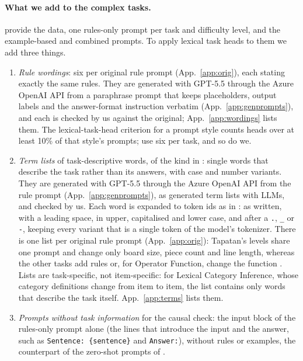 \documentclass[11pt,a4paper]{article}
\begin{document}
\paragraph{What we add to the complex tasks.}\label{sec:adapt} \citet{fu2026rules} provide the data, one rules-only prompt per task and difficulty level, and the example-based and combined prompts. To apply lexical task heads to them we add three things.
\begin{enumerate}
\item \emph{Rule wordings}: six per original rule prompt (App.~\ref{app:orig}), each stating exactly the same rules. They are generated with GPT-5.5 through the Azure OpenAI API from a paraphrase prompt that keeps placeholders, output labels and the answer-format instruction verbatim (App.~\ref{app:genprompts}), and each is checked by us against the original; App.~\ref{app:wordings} lists them. The lexical-task-head criterion for a prompt style counts heads over at least 10\% of that style's prompts; \citet{yang2026shared} use six per task, and so do we.
\item \emph{Term lists} of task-descriptive words, of the kind in \citet[App.~A.2.1]{yang2026shared}: single words that describe the task rather than its answers, with case and number variants. They are generated with GPT-5.5 through the Azure OpenAI API from the rule prompt (App.~\ref{app:genprompts}), as \citet[App.~O]{yang2026shared} generated term lists with LLMs, and checked by us. Each word is expanded to token ids as in \citet{yang2026shared}: as written, with a leading space, in upper, capitalised and lower case, and after a \texttt{.}, \texttt{\_} or \texttt{-}, keeping every variant that is a single token of the model's tokenizer. There is one list per original rule prompt (App.~\ref{app:orig}): Tapatan's levels share one prompt and change only board size, piece count and line length, whereas the other tasks add rules or, for Operator Function, change the function \citep[Table~1, App.~F]{fu2026rules}. Lists are task-specific, not item-specific: for Lexical Category Inference, whose category definitions change from item to item, the list contains only words that describe the task itself. App.~\ref{app:terms} lists them.
\item \emph{Prompts without task information} for the causal check: the input block of the rules-only prompt alone (the lines that introduce the input and the answer, such as \texttt{Sentence: \{sentence\}} and \texttt{Answer:}), without rules or examples, the counterpart of the zero-shot prompts of \citet[Sec.~2.3.2]{yang2026shared}.
\end{enumerate}
\end{document}
